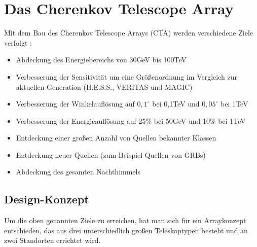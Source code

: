 \chapter{Das Cherenkov Telescope Array}
\label{ch:CTA}
Mit dem Bau des Cherenkov Telescope Arrays (CTA) werden verschiedene Ziele verfolgt \cite{NextGen}:
\begin{itemize}

\item Abdeckung des Energiebereichs von 30GeV bis 100TeV
\item Verbesserung der Sensitivität um eine Größenordnung im Vergleich zur aktuellen Generation (H.E.S.S., VERITAS und MAGIC)
\item Verbesserung der Winkelauflösung auf $0,1^{\circ}$ bei 0,1TeV und $0,05^{\circ}$ bei 1TeV
\item Verbesserung der Energieauflösung auf 25\% bei 50GeV und 10\% bei 1TeV
\item Entdeckung einer großen Anzahl von Quellen bekannter Klassen
\item Entdeckung neuer Quellen (zum Beispiel Quellen von GRBs)
\item Abdeckung des gesamten Nachthimmels %
\end{itemize}

\section{Design-Konzept}
Um die oben genannten Ziele zu erreichen, hat man sich für ein Arraykonzept entschieden, das aus drei unterschiedlich großen Teleskoptypen besteht und an zwei Standorten errichtet wird.

